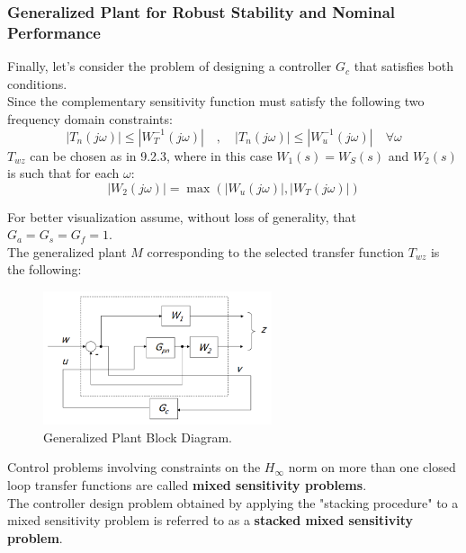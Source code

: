 \documentclass[a4paper,10pt,titlepage]{article}
\numberwithin{equation}{subsection}
\begin{document}
	\subsubsection{Generalized Plant for Robust Stability and Nominal Performance}
	Finally, let's consider the problem of designing a controller $G_c$ that satisfies both conditions.\\
	Since the complementary sensitivity function must satisfy the following two frequency domain constraints:
	\begin{equation}
		\left| T_n(j\omega) \right| \leq \left| W_T^{-1}(j\omega) \right| \quad , \quad \left| T_n(j\omega) \right| \leq \left| W_u^{-1}(j\omega) \right| \quad \forall\omega
	\end{equation}
	$T_{wz}$ can be chosen as in 9.2.3, where in this case $W_1(s) = W_S(s)$ and $W_2(s)$ is such that for each $\omega$:
	\begin{equation}
		\left| W_2(j\omega) \right| = \max \left( \left| W_u(j\omega) \right| , \left| W_T(j\omega) \right| \right)
	\end{equation}
	
	For better visualization assume, without loss of generality, that $G_a=G_s=G_f=1$.\\
	The generalized plant $M$ corresponding to the selected transfer function $T_{wz}$ is the following:
	
	\begin{figure}[H] %
		\centering
		\includegraphics[width=0.6\textwidth]{images/generalized_plant.png}
		\caption{Generalized Plant Block Diagram.}
		\label{fig:image12}
	\end{figure}
	
	Control problems involving constraints on the $H_\infty$ norm on more than one closed loop transfer functions are called \textbf{mixed sensitivity problems}.\\
	The controller design problem obtained by applying the "stacking procedure" to a mixed sensitivity problem is referred to as a \textbf{stacked mixed sensitivity problem}.
	
\end{document}
